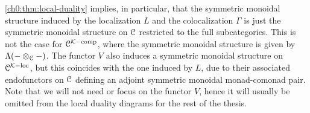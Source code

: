 \begin{remark}
    \label{ch0:rm:monoidal-structure-in-local-duality}
    \cref{ch0:thm:local-duality} implies, in particular, that the symmetric monoidal structure induced by the localization $L$ and the colocalization $\Gamma$ is just the symmetric monoidal structure on $\EuScript{C}$ restricted to the full subcategories. This is not the case for $\EuScript{C}^{\mathcal{K}-\mathrm{comp}}$, where the symmetric monoidal structure is given by $\Lambda(-\otimes_{\EuScript{C}}-)$. The functor $V$ also induces a symmetric monoidal structure on $\EuScript{C}^{\mathcal{K}-\mathrm{loc}}$, but this coincides with the one induced by $L$, due to their associated endofunctors on $\EuScript{C}$ defining an adjoint symmetric monoidal monad-comonad pair. Note that we will not need or focus on the functor $V$, hence it will usually be omitted from the local duality diagrams for the rest of the thesis. 
\end{remark}


